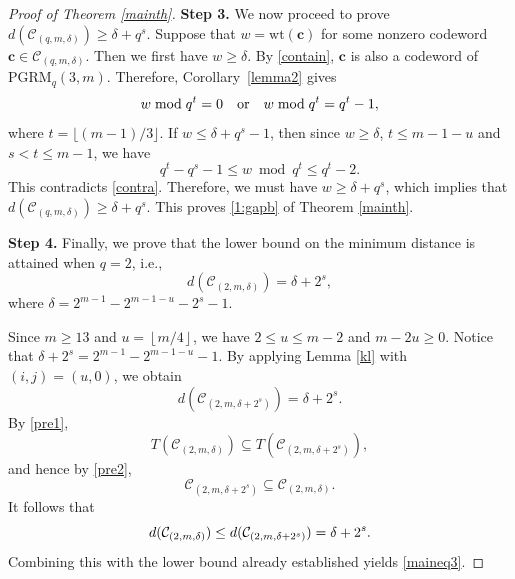 \documentclass[journal,onecolumn]{IEEEtran}
\newcommand{\PGRM}{\mathrm{PGRM}}
\begin{document}
\begin{proof}[Proof of Theorem \ref{mainth}]
{\bf Step 3.} We now proceed to prove   
$d(\mathcal{C}_{(q,m,\delta)}) \geq \delta+q^{s}$.
Suppose that $w = \mathrm{wt}(\mathbf{c})$ for some nonzero codeword $\mathbf{c} \in \mathcal{C}_{(q,m,\delta)}$. Then we first have $w \ge \delta$.
By \eqref{contain}, $\mathbf c$ is also a 
codeword of $\PGRM_q(3,m)$. Therefore,  Corollary~\ref{lemma2}
gives 
\begin{equation}\notag
    w \bmod q^t = 0 \quad \text{or} \quad w \bmod q^t = q^t - 1,
\end{equation}
where $t=\lfloor(m-1)/3\rfloor$.
 If $w \le \delta + q^s - 1$, then since $w\geq \delta$,  $t \le m - 1 - u$ and $s < t \le m - 1$, we have
\begin{equation*}
    q^t - q^s - 1 \le w \bmod q^t \le q^t - 2.
\end{equation*}
This contradicts \eqref{contra}. Therefore, we must have $w \ge \delta + q^s$, which implies that $d(\mathcal{C}_{(q,m,\delta)}) \geq \delta+q^{s}$. This proves \eqref{1:gapb} of Theorem \ref{mainth}. 

{\bf Step 4.} Finally, we prove that the lower bound on the minimum distance is attained
when $q=2$, i.e.,
\begin{equation}\label{maineq3}
d(\mathcal{C}_{(2,m,\delta)}) = \delta+{2}^s,
\end{equation}
where $\delta=2^{m-1}-2^{m-1-u}-2^s-1$. 

Since $m\geq 13$ and $u=\left\lfloor m/4\right\rfloor$, we have
$2\leq u\leq m-2$ and $m-2u\geq0$. Notice that $\delta+2^s=2^{m-1}-2^{m-1-u}-1$. 
By applying Lemma \ref{kl} with $(i,j)=(u,0)$, we obtain 
\begin{equation*}
d(\mathcal{C}_{(2,m,\delta+2^s)}) = \delta+2^s.
\end{equation*}
By \eqref{pre1},
\begin{equation*} T(\mathcal{C}_{(2,m,\delta)})  \subseteq T(\mathcal{C}_{(2,m,\delta+2^s)}), 
\end{equation*}
and hence  by \eqref{pre2}, 
\begin{equation*}  \mathcal{C}_{(2,m,\delta+2^s)} \subseteq \mathcal{C}_{(2,m,\delta)}.
\end{equation*}
It follows that 
\begin{equation}\notag
d(\mathcal{C}_{(2,m,\delta)})
\leq d(\mathcal{C}_{(2,m,\delta+2^s)})
= \delta+2^s. 
\end{equation}
Combining this with the lower bound already established yields \eqref{maineq3}.
\end{proof}
\end{document}
